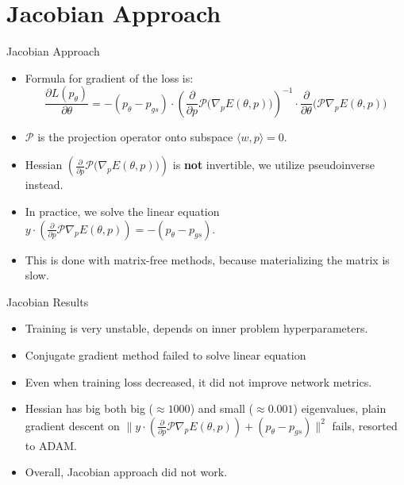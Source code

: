 \documentclass{beamer}
\begin{document}
\section{Jacobian Approach}
\begin{frame}{Jacobian Approach}
  \begin{itemize}
    \item Formula for gradient of the loss is:
    \[
      \frac{\partial L(p_{\theta})}{\partial \theta} = -(p_{\theta}-p_{gs}) \cdot \left(\frac{\partial}{\partial p}\mathcal{P}\big(\nabla_p E(\theta, p)\big)\right)^{-1} \cdot \frac{\partial}{\partial \theta}\big(\mathcal{P}\nabla_p E(\theta, p)\big)
    \]
    \item  $\mathcal{P}$ is the projection operator onto subspace $\langle w,p \rangle = 0$.
    \item Hessian $ \left(\frac{\partial}{\partial p}\mathcal{P}\big(\nabla_p E(\theta, p)\big)\right)$ is \textbf{not} invertible, we utilize pseudoinverse instead.
    \item In practice, we solve the linear equation $ y \cdot \left(\frac{\partial}{\partial p}\mathcal{P}\nabla_p E(\theta, p)\right) = -(p_{\theta}-p_{gs})$.
    \item This is done with matrix-free methods, because materializing the matrix is slow.
  \end{itemize}
\end{frame}

\begin{frame}{Jacobian Results}
  \begin{itemize}
    \item Training is very unstable, depends on inner problem hyperparameters.
    \item Conjugate gradient method failed to solve linear equation
    \item Even when training loss decreased, it did not improve network metrics.
    \item Hessian has big both big ($\approx 1000$) and small ($\approx 0.001$) eigenvalues, plain gradient descent on $\|y \cdot \left(\frac{\partial}{\partial p}\mathcal{P}\nabla_p E(\theta, p)\right) + (p_{\theta}-p_{gs})\|^2$ fails, resorted to ADAM.
    \item Overall, Jacobian approach did not work.
  \end{itemize}
\end{frame}



\end{document}
